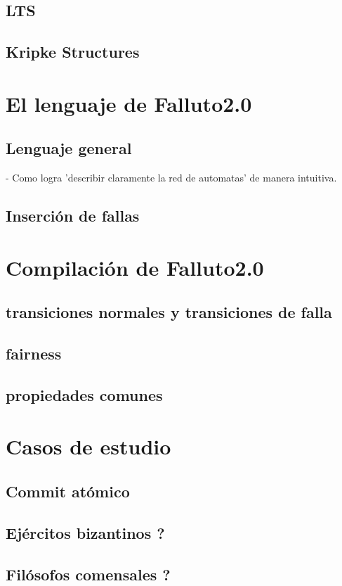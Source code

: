 \documentclass[titlepage, 12pt]{book}
\begin{document}
			\section{LTS}
			\section{Kripke Structures}


\chapter{El lenguaje de Falluto2.0}
			\section{Lenguaje general}
				- Como logra 'describir claramente la red de automatas' de manera intuitiva.
			\section{Inserci\'on de fallas}
			
\chapter{Compilaci\'on de Falluto2.0}
			\section{transiciones normales y transiciones de falla}
			\section{fairness}
			\section{propiedades comunes}

\chapter{Casos de estudio}
			\section{Commit at\'omico}
			\section{Ej\'ercitos bizantinos ?}
			\section{Fil\'osofos comensales ?}
\end{document}
